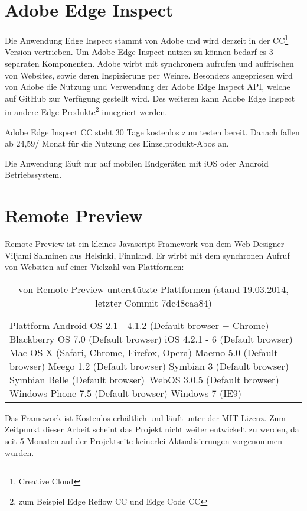 \documentclass[13pt,a4paper,oneside]{scrbook} %
\newcommand{\mi}[1]{\index{#1}#1}
\renewcommand{\\}{\bigskip}
\begin{document}
	\section{\mi{Adobe Edge Inspect}}
	Die Anwendung Edge Inspect stammt von Adobe und wird derzeit in der CC\footnote{Creative Cloud} Version vertrieben. Um 		Adobe Edge Inspect nutzen zu können bedarf es 3 separaten Komponenten. Adobe wirbt mit synchronem aufrufen und 			auffrischen von Websites, sowie deren Inspizierung per Weinre. Besonders angepriesen wird von Adobe die Nutzung und 		Verwendung der Adobe Edge Inspect API, welche auf GitHub zur Verfügung gestellt wird. Des weiteren kann Adobe Edge 		Inspect in andere Edge Produkte\footnote{zum Beispiel Edge Reflow CC und Edge Code CC} innegriert werden. 
	
	\\Adobe Edge Inspect CC steht 30 Tage kostenlos zum testen bereit. Danach fallen ab 24,59/ Monat für die Nutzung des 			Einzelprodukt-Abos an.
	
	\\Die Anwendung läuft nur auf mobilen Endgeräten mit iOS oder Android Betriebssystem.
	
	\section{\mi{Remote Preview}}
	Remote Preview ist ein kleines Javascript Framework von dem Web Designer Viljami Salminen aus Helsinki, Finnland. Er wirbt 	mit dem synchronen Aufruf von Websiten auf einer Vielzahl von Plattformen: 
	
	\begin{table}[h]
 		\centering
			\begin{tabular}{| p{13cm} |}
			
			\hline
				Plattform\\
			\hline
			\hline
				Android OS 2.1 - 4.1.2 (Default browser + Chrome)\\
				Blackberry OS 7.0 (Default browser)\\
				iOS 4.2.1 - 6 (Default browser)\\
				Mac OS X (Safari, Chrome, Firefox, Opera)\\
				Maemo 5.0 (Default browser)\\
				Meego 1.2 (Default browser)\\
				Symbian 3 (Default browser)\\
				Symbian Belle (Default browser)\
				WebOS 3.0.5 (Default browser)\\
				Windows Phone 7.5 (Default browser)\\	
				Windows 7 (IE9)\\
				\hline
				\end{tabular}
			\caption{von Remote Preview unterstützte Plattformen (stand 19.03.2014, letzter Commit 7dc48caa84)}
	\end{table}
	Das Framework ist Kostenlos erhältlich und läuft unter der MIT Lizenz. Zum Zeitpunkt dieser Arbeit scheint das Projekt nicht weiter entwickelt zu werden, da seit 5 Monaten auf der Projektseite keinerlei Aktualisierungen vorgenommen wurden.
\end{document}
